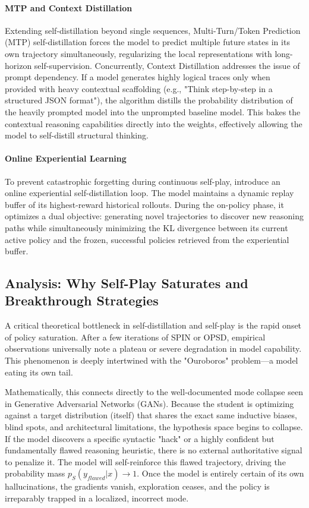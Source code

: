\paragraph{MTP and Context Distillation}
Extending self-distillation beyond single sequences, Multi-Turn/Token Prediction (MTP) self-distillation \citep{2602.06019} forces the model to predict multiple future states in its own trajectory simultaneously, regularizing the local representations with long-horizon self-supervision. Concurrently, Context Distillation \citep{2602.12275} addresses the issue of prompt dependency. If a model generates highly logical traces only when provided with heavy contextual scaffolding (e.g., "Think step-by-step in a structured JSON format"), the algorithm distills the probability distribution of the heavily prompted model into the unprompted baseline model. This bakes the contextual reasoning capabilities directly into the weights, effectively allowing the model to self-distill structural thinking.

\paragraph{Online Experiential Learning}
To prevent catastrophic forgetting during continuous self-play, \citet{2603.16856} introduce an online experiential self-distillation loop. The model maintains a dynamic replay buffer of its highest-reward historical rollouts. During the on-policy phase, it optimizes a dual objective: generating novel trajectories to discover new reasoning paths while simultaneously minimizing the KL divergence between its current active policy and the frozen, successful policies retrieved from the experiential buffer.

\subsection{Analysis: Why Self-Play Saturates and Breakthrough Strategies}
\label{subsec:saturation_analysis}

A critical theoretical bottleneck in self-distillation and self-play is the rapid onset of policy saturation. After a few iterations of SPIN or OPSD, empirical observations universally note a plateau or severe degradation in model capability. This phenomenon is deeply intertwined with the "Ouroboros" problem—a model eating its own tail.

Mathematically, this connects directly to the well-documented mode collapse seen in Generative Adversarial Networks (GANs). Because the student is optimizing against a target distribution (itself) that shares the exact same inductive biases, blind spots, and architectural limitations, the hypothesis space begins to collapse. If the model discovers a specific syntactic "hack" or a highly confident but fundamentally flawed reasoning heuristic, there is no external authoritative signal to penalize it. The model will self-reinforce this flawed trajectory, driving the probability mass $p_S(y_{flawed}|x) \to 1$. Once the model is entirely certain of its own hallucinations, the gradients vanish, exploration ceases, and the policy is irreparably trapped in a localized, incorrect mode.

